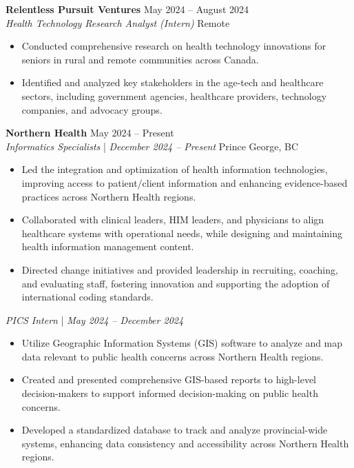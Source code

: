 \documentclass[11pt]{article}
\begin{document}
\vspace{8pt}

\noindent\textbf{Relentless Pursuit Ventures} \hfill May 2024 – August 2024 \\
\textit{Health Technology Research Analyst (Intern)} \hfill Remote
\begin{itemize}[leftmargin=*, topsep=2pt, itemsep=1pt, parsep=0pt]
\item Conducted comprehensive research on health technology innovations for seniors in rural and remote communities across Canada.
\item Identified and analyzed key stakeholders in the age-tech and healthcare sectors, including government agencies, healthcare providers, technology companies, and advocacy groups.
\end{itemize}

\vspace{8pt}

\noindent\textbf{Northern Health} \hfill May 2024 – Present \\
\textit{Informatics Specialists} | \textit{December 2024 – Present} \hfill Prince George, BC
\begin{itemize}[leftmargin=*, topsep=2pt, itemsep=1pt, parsep=0pt]
\item Led the integration and optimization of health information technologies, improving access to patient/client information and enhancing evidence-based practices across Northern Health regions.
\item Collaborated with clinical leaders, HIM leaders, and physicians to align healthcare systems with operational needs, while designing and maintaining health information management content.
\item Directed change initiatives and provided leadership in recruiting, coaching, and evaluating staff, fostering innovation and supporting the adoption of international coding standards.
\end{itemize}

\vspace{1pt}
\textit{PICS Intern} | \textit{May 2024 – December 2024}
\begin{itemize}[leftmargin=*, topsep=2pt, itemsep=1pt, parsep=0pt]
\item Utilize Geographic Information Systems (GIS) software to analyze and map data relevant to public health concerns across Northern Health regions.
\item Created and presented comprehensive GIS-based reports to high-level decision-makers to support informed decision-making on public health concerns.
\item Developed a standardized database to track and analyze provincial-wide systems, enhancing data consistency and accessibility across Northern Health regions.
\end{itemize}
\end{document}
